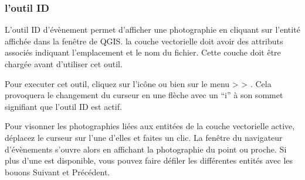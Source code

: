 \subsubsection{l'outil ID}\label{evis_id_tool}

L'outil ID d'évènement permet d'afficher une photographie en cliquant sur l'entité affichée dans la fenêtre de QGIS. la couche vectorielle doit avoir des attributs associés indiquant l'emplacement et le nom du fichier. Cette couche doit être chargée avant d'utiliser cet outil.

\label{evis_launch_id}


Pour executer cet outil, cliquez sur l'icône  ou bien sur le menu  >  > . Cela provoquera le changement du curseur en une flèche avec un ``i''  à son sommet signifiant que l'outil ID est actif.


Pour visonner les photographies liées aux entitées de la couche vectorielle active, déplacez le curseur sur l'une d'elles et faites un clic. La fenêtre du navigateur d'évènements s'ouvre alors en affichant la photographie du point ou proche. Si plus d'une est disponible, vous pouvez faire défiler les différentes entités avec les bouons Suivant et Précédent.

